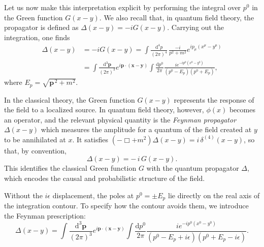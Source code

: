 Let us now make this interpretation explicit by performing the integral over \(p^0\) in the Green function \(G(x - y)\).
We also recall that, in quantum field theory, the propagator is defined as \(\Delta(x - y) = -iG(x - y)\).
Carrying out the integration, one finds
\[
    \begin{aligned}
        \Delta(x - y)
         & = -iG(x - y)
        = \int \frac{\mathrm{d}^4p}{(2\pi)^4} \,
        \frac{-i }{p^2 + m^2}e^{ip_\mu (x^{\mu} - y^{\mu})}                                                                                                           \\
         & = \int \frac{\mathrm{d}^3\mathbf{p}}{(2\pi)^3} e^{i\mathbf{p} \cdot (\mathbf{x} - \mathbf{y})} \int \frac{\mathrm{d}p^0}{2\pi}\frac{ie^{-ip^0(x^0 - y^0)}}
        {(p^0 - E_p)(p^0 + E_p)},
    \end{aligned}
\]
where \(E_p = \sqrt{\mathbf{p}^{\,2} + m^2}\).

\begin{remark}
    In the classical theory, the Green function \(G(x - y)\) represents the response of the field to a localized source.
    In quantum field theory, however, \(\phi(x)\) becomes an operator, and the relevant physical quantity is the \textit{Feynman propagator} \(\Delta(x - y)\) which measures the amplitude for a quantum of the field created at \(y\) to be annihilated at \(x\).
    It satisfies \((-\Box + m^2)\Delta(x - y) = i\,\delta^{(4)}(x - y)\), so that, by convention,
    \[
        \boxed{\Delta(x - y) = -\,i\,G(x - y).}
    \]
    This identifies the classical Green function \(G\) with the quantum propagator \(\Delta\), which encodes the causal and probabilistic structure of the field.
\end{remark}

Without the \(i\epsilon\) displacement, the poles at \(p^0 = \pm E_p\) lie directly on the real axis of the integration contour.
To specify how the contour avoids them, we introduce the Feynman prescription:
\[
    \Delta(x - y) = \int \frac{\mathrm{d}^3\mathbf{p}}{(2\pi)^3} e^{i\mathbf{p} \cdot (\mathbf{x} - \mathbf{y})}
    \int \frac{\mathrm{d}p^0}{2\pi} \frac{ie^{-ip^0(x^0 - y^0)}}{(p^0 - E_p + i\epsilon)(p^0 + E_p - i\epsilon)}.
\]

